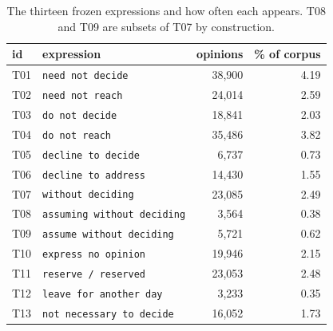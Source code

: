 \begin{table}[t]
\centering\footnotesize
\begin{tabular}{llrr}
\toprule
id & expression & opinions & \% of corpus \\
\midrule
T01 & \texttt{need not decide} & 38,900 & 4.19 \\
T02 & \texttt{need not reach} & 24,014 & 2.59 \\
T03 & \texttt{do not decide} & 18,841 & 2.03 \\
T04 & \texttt{do not reach} & 35,486 & 3.82 \\
T05 & \texttt{decline to decide} & 6,737 & 0.73 \\
T06 & \texttt{decline to address} & 14,430 & 1.55 \\
T07 & \texttt{without deciding} & 23,085 & 2.49 \\
T08 & \texttt{assuming without deciding} & 3,564 & 0.38 \\
T09 & \texttt{assume without deciding} & 5,721 & 0.62 \\
T10 & \texttt{express no opinion} & 19,946 & 2.15 \\
T11 & \texttt{reserve / reserved} & 23,053 & 2.48 \\
T12 & \texttt{leave for another day} & 3,233 & 0.35 \\
T13 & \texttt{not necessary to decide} & 16,052 & 1.73 \\
\bottomrule
\end{tabular}
\caption{The thirteen frozen expressions and how often each appears. T08 and T09 are subsets of T07 by construction.}
\label{tab:trigger}
\end{table}
